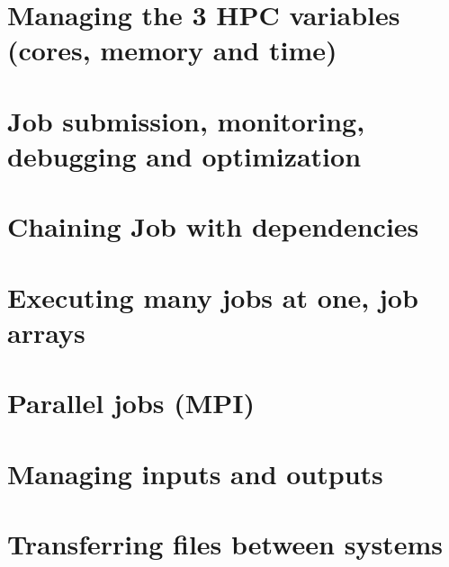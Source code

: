 \section{Managing the 3 HPC variables (cores, memory and time)}
\section{Job submission, monitoring, debugging and optimization}
\section{Chaining Job with dependencies}
\section{Executing many jobs at one, job arrays}
\section{Parallel jobs (MPI)}

\section{Managing inputs and outputs}
\section{Transferring files between systems}
